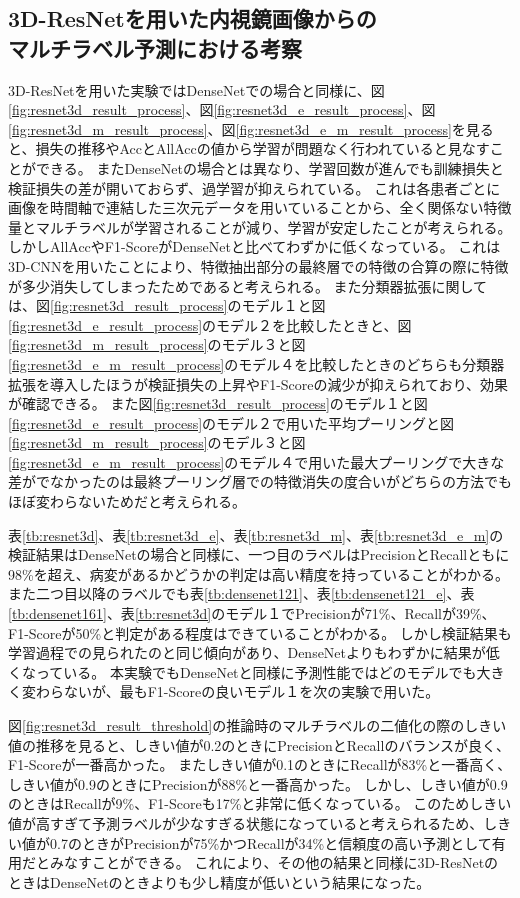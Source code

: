 \subsection{3D-ResNetを用いた内視鏡画像からの\\マルチラベル予測における考察}
3D-ResNetを用いた実験ではDenseNetでの場合と同様に、図\ref{fig:resnet3d_result_process}、図\ref{fig:resnet3d_e_result_process}、図\ref{fig:resnet3d_m_result_process}、図\ref{fig:resnet3d_e_m_result_process}を見ると、損失の推移やAccとAllAccの値から学習が問題なく行われていると見なすことができる。
またDenseNetの場合とは異なり、学習回数が進んでも訓練損失と検証損失の差が開いておらず、過学習が抑えられている。
これは各患者ごとに画像を時間軸で連結した三次元データを用いていることから、全く関係ない特徴量とマルチラベルが学習されることが減り、学習が安定したことが考えられる。
しかしAllAccやF1-ScoreがDenseNetと比べてわずかに低くなっている。
これは3D-CNNを用いたことにより、特徴抽出部分の最終層での特徴の合算の際に特徴が多少消失してしまったためであると考えられる。
また分類器拡張に関しては、図\ref{fig:resnet3d_result_process}のモデル１と図\ref{fig:resnet3d_e_result_process}のモデル２を比較したときと、図\ref{fig:resnet3d_m_result_process}のモデル３と図\ref{fig:resnet3d_e_m_result_process}のモデル４を比較したときのどちらも分類器拡張を導入したほうが検証損失の上昇やF1-Scoreの減少が抑えられており、効果が確認できる。
また図\ref{fig:resnet3d_result_process}のモデル１と図\ref{fig:resnet3d_e_result_process}のモデル２で用いた平均プーリングと図\ref{fig:resnet3d_m_result_process}のモデル３と図\ref{fig:resnet3d_e_m_result_process}のモデル４で用いた最大プーリングで大きな差がでなかったのは最終プーリング層での特徴消失の度合いがどちらの方法でもほぼ変わらないためだと考えられる。

表\ref{tb:resnet3d}、表\ref{tb:resnet3d_e}、表\ref{tb:resnet3d_m}、表\ref{tb:resnet3d_e_m}の検証結果はDenseNetの場合と同様に、一つ目のラベルはPrecisionとRecallともに98\%を超え、病変があるかどうかの判定は高い精度を持っていることがわかる。
また二つ目以降のラベルでも表\ref{tb:densenet121}、表\ref{tb:densenet121_e}、表\ref{tb:densenet161}、表\ref{tb:resnet3d}のモデル１でPrecisionが71\%、Recallが39\%、F1-Scoreが50\%と判定がある程度はできていることがわかる。
しかし検証結果も学習過程での見られたのと同じ傾向があり、DenseNetよりもわずかに結果が低くなっている。
本実験でもDenseNetと同様に予測性能ではどのモデルでも大きく変わらないが、最もF1-Scoreの良いモデル１を次の実験で用いた。

図\ref{fig:resnet3d_result_threshold}の推論時のマルチラベルの二値化の際のしきい値の推移を見ると、しきい値が0.2のときにPrecisionとRecallのバランスが良く、F1-Scoreが一番高かった。
またしきい値が0.1のときにRecallが83\%と一番高く、しきい値が0.9のときにPrecisionが88\%と一番高かった。
しかし、しきい値が0.9のときはRecallが9\%、F1-Scoreも17\%と非常に低くなっている。
このためしきい値が高すぎて予測ラベルが少なすぎる状態になっていると考えられるため、しきい値が0.7のときがPrecisionが75\%かつRecallが34\%と信頼度の高い予測として有用だとみなすことができる。
これにより、その他の結果と同様に3D-ResNetのときはDenseNetのときよりも少し精度が低いという結果になった。

